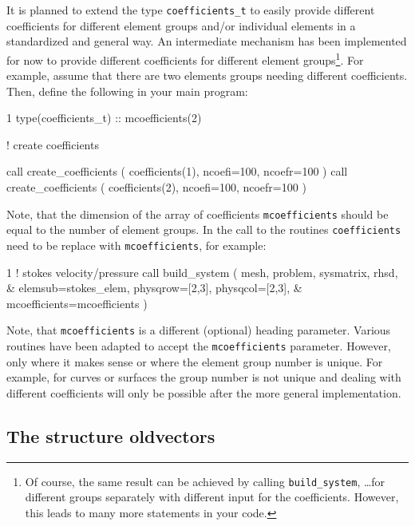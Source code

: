 It is planned to extend the type \texttt{coefficients\_t} to easily provide
different coefficients for different element groups and/or individual elements
in a standardized and general way.
An intermediate mechanism has been implemented for now to
provide different coefficients for different element groups\footnote{Of course,
the same result can be achieved by calling \texttt{build\_system}, \ldots for
different groups separately with different input for the coefficients. However, this
leads to many more statements in your code.}. For example,
assume that there are two elements groups needing different coefficients. Then, define
the following in your main program:
\begin{listing}{1}
  type(coefficients_t) :: mcoefficients(2)

  ! create coefficients

  call create_coefficients ( coefficients(1), ncoefi=100, ncoefr=100 )
  call create_coefficients ( coefficients(2), ncoefi=100, ncoefr=100 )

\end{listing}
Note,
 that the dimension of the array of coefficients \texttt{mcoefficients} should
be equal to the number of element groups.
In the call to the routines \texttt{coefficients} need to be replace with \texttt{mcoefficients}, for example:
\begin{listing}{1}
! stokes velocity/pressure
  call build_system ( mesh, problem, sysmatrix, rhsd, &
    elemsub=stokes_elem, physqrow=[2,3], physqcol=[2,3], &
    mcoefficients=mcoefficients )
\end{listing}
Note, that \texttt{mcoefficients} is a different (optional) heading parameter.
Various routines have been adapted to accept the \texttt{mcoefficients} parameter.
However, only where it makes sense or where the element group number is unique. For example, for curves or surfaces
the group number is not unique and dealing with different coefficients will only be possible after the more
general implementation.

\subsection{The structure oldvectors}
\label{sec:oldvectors}

